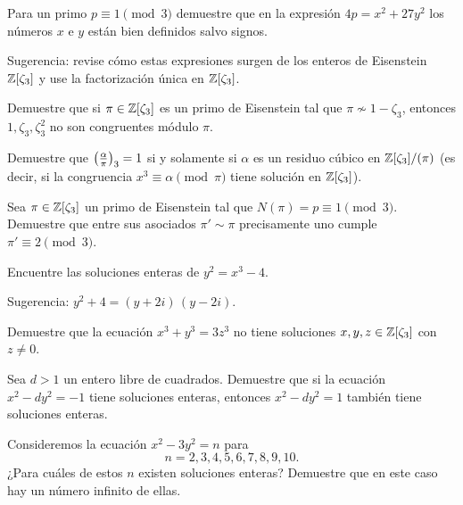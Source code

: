\begin{ejercicio}
  Para un primo $p\equiv 1\pmod{3}$ demuestre que en la expresión
  $4p = x^2 + 27y^2$ los números $x$ e $y$ están bien definidos salvo
  signos.

  Sugerencia: revise cómo estas expresiones surgen de los enteros de Eisenstein
  $\mathbb{Z} [\zeta_3]$ y use la factorización única en $\mathbb{Z} [\zeta_3]$.
\end{ejercicio}

\begin{ejercicio}
  Demuestre que si $\pi\in\mathbb{Z}[\zeta_3]$ es un primo de Eisenstein tal que
  $\pi\not\sim 1-\zeta_3$, entonces $1,\zeta_3,\zeta_3^2$ no son congruentes
  módulo $\pi$.
\end{ejercicio}

\begin{ejercicio}
  Demuestre que $\left(\frac{\alpha}{\pi}\right)_3 = 1$ si y solamente si $\alpha$ es un
  residuo cúbico en $\mathbb{Z} [\zeta_3]/(\pi)$ (es decir, si la congruencia
  $x^3 \equiv \alpha \pmod{\pi}$ tiene solución en $\mathbb{Z} [\zeta_3]$).
\end{ejercicio}

\begin{ejercicio}
  Sea $\pi \in \mathbb{Z} [\zeta_3]$ un primo de Eisenstein tal que
  $N (\pi) = p \equiv 1 \pmod{3}$. Demuestre que entre sus asociados
  $\pi' \sim \pi$ precisamente uno cumple $\pi' \equiv 2 \pmod{3}$.
\end{ejercicio}

\begin{ejercicio}
  Encuentre las soluciones enteras de $y^2 = x^3 - 4$.

  Sugerencia: $y^2 + 4 = (y + 2i)\,(y - 2i)$.
\end{ejercicio}

\begin{ejercicio}
  Demuestre que la ecuación $x^3 + y^3 = 3z^3$ no tiene soluciones
  $x,y,z \in \mathbb{Z} [\zeta_3]$ con $z\ne 0$.
\end{ejercicio}

\begin{ejercicio}
  Sea $d > 1$ un entero libre de cuadrados. Demuestre que si la ecuación
  $x^2 - dy^2 = -1$ tiene soluciones enteras, entonces $x^2 - dy^2 = 1$
  también tiene soluciones enteras.
\end{ejercicio}

\begin{ejercicio}
  Consideremos la ecuación $x^2 - 3y^2 = n$ para
  $$n = 2,3,4,5,6,7,8,9,10.$$
  ¿Para cuáles de estos $n$ existen soluciones enteras? Demuestre que en este
  caso hay un número infinito de ellas.
\end{ejercicio}

